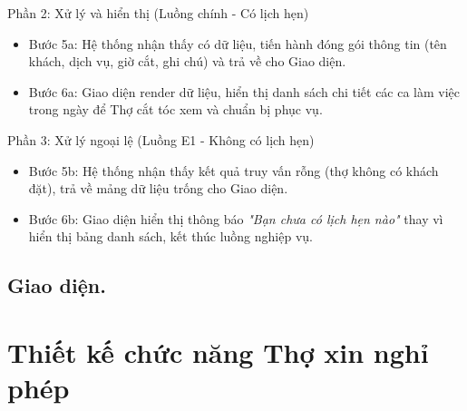 \documentclass[../BTL.tex]{subfiles}
\begin{document}
Phần 2: Xử lý và hiển thị (Luồng chính - Có lịch hẹn)

\begin{itemize}
\item
  Bước 5a: Hệ thống nhận thấy có dữ liệu, tiến hành đóng gói thông tin
  (tên khách, dịch vụ, giờ cắt, ghi chú) và trả về cho Giao diện.
\item
  Bước 6a: Giao diện render dữ liệu, hiển thị danh sách chi tiết các ca
  làm việc trong ngày để Thợ cắt tóc xem và chuẩn bị phục vụ.
\end{itemize}

Phần 3: Xử lý ngoại lệ (Luồng E1 - Không có lịch hẹn)

\begin{itemize}
\item
  Bước 5b: Hệ thống nhận thấy kết quả truy vấn rỗng (thợ không có khách
  đặt), trả về mảng dữ liệu trống cho Giao diện.
\item
  Bước 6b: Giao diện hiển thị thông báo \emph{"Bạn chưa có lịch hẹn
  nào"} thay vì hiển thị bảng danh sách, kết thúc luồng nghiệp vụ.
\end{itemize}

\subsection{Giao diện.}

\section{Thiết kế chức năng Thợ xin nghỉ phép}
\end{document}
